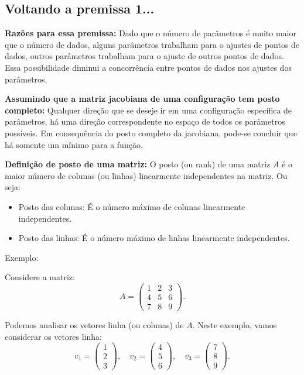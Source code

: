 \documentclass{article}
\begin{document}
\subsection{Voltando a premissa 1...}
\textbf{Razões para essa premissa:} Dado que o número de parâmetros é muito maior que o número de dados, alguns parâmetros trabalham para o ajustes de pontos de dados, outros parâmetros trabalham para o ajuste de outros pontos de dados. Essa possibilidade diminui a concorrência entre pontos de dados nos ajustes dos parâmetros. 

\noindent\textbf{Assumindo que a matriz jacobiana de uma configuração tem posto completo:}
Qualquer direção que se deseje ir em uma configuração específica de parâmetros, há uma direção correspondente no espaço de todos os parâmetros possíveis. Em consequência do posto completo da jacobiana, pode-se concluir que há somente um mínimo para a função. 

\noindent\textbf{Definição de posto de uma matriz:} O posto (ou rank) de uma matriz $A$ é o maior número de colunas (ou linhas) linearmente independentes na matriz. Ou seja:
\begin{itemize}
    \item Posto das colunas: É o número máximo de colunas linearmente independentes.
    \item Posto das linhas: É o número máximo de linhas linearmente independentes.
\end{itemize}
Exemplo:

\noindent Considere a matriz:
\[
A = \begin{pmatrix}
1 & 2 & 3 \\
4 & 5 & 6 \\
7 & 8 & 9 
\end{pmatrix}.
\]

\noindent Podemos analisar os vetores linha (ou colunas) de \(A\). Neste exemplo, vamos considerar os vetores linha:
\[
v_1 = \begin{pmatrix} 1 \\ 2 \\ 3 \end{pmatrix}, \quad
v_2 = \begin{pmatrix} 4 \\ 5 \\ 6 \end{pmatrix}, \quad
v_3 = \begin{pmatrix} 7 \\ 8 \\ 9 \end{pmatrix}.
\]
\end{document}
